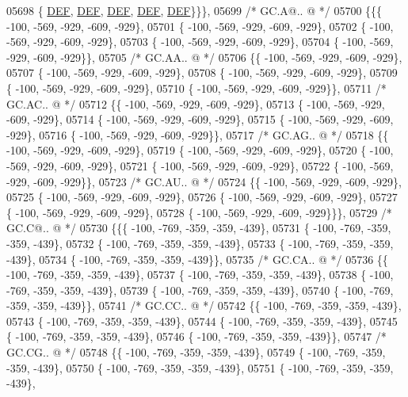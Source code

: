 \begin{DoxyCode}
05698 \{  \mbox{\hyperlink{1_88_84__epars_8h_a397419fc12b37ed479c8abb9d444d843}{DEF}},  \mbox{\hyperlink{1_88_84__epars_8h_a397419fc12b37ed479c8abb9d444d843}{DEF}},  \mbox{\hyperlink{1_88_84__epars_8h_a397419fc12b37ed479c8abb9d444d843}{DEF}},  \mbox{\hyperlink{1_88_84__epars_8h_a397419fc12b37ed479c8abb9d444d843}{DEF}},  \mbox{\hyperlink{1_88_84__epars_8h_a397419fc12b37ed479c8abb9d444d843}{DEF}}\}\}\},
05699 \textcolor{comment}{/* GC.A@.. @ */}
05700 \{\{\{ -100, -569, -929, -609, -929\},
05701 \{ -100, -569, -929, -609, -929\},
05702 \{ -100, -569, -929, -609, -929\},
05703 \{ -100, -569, -929, -609, -929\},
05704 \{ -100, -569, -929, -609, -929\}\},
05705 \textcolor{comment}{/* GC.AA.. @ */}
05706 \{\{ -100, -569, -929, -609, -929\},
05707 \{ -100, -569, -929, -609, -929\},
05708 \{ -100, -569, -929, -609, -929\},
05709 \{ -100, -569, -929, -609, -929\},
05710 \{ -100, -569, -929, -609, -929\}\},
05711 \textcolor{comment}{/* GC.AC.. @ */}
05712 \{\{ -100, -569, -929, -609, -929\},
05713 \{ -100, -569, -929, -609, -929\},
05714 \{ -100, -569, -929, -609, -929\},
05715 \{ -100, -569, -929, -609, -929\},
05716 \{ -100, -569, -929, -609, -929\}\},
05717 \textcolor{comment}{/* GC.AG.. @ */}
05718 \{\{ -100, -569, -929, -609, -929\},
05719 \{ -100, -569, -929, -609, -929\},
05720 \{ -100, -569, -929, -609, -929\},
05721 \{ -100, -569, -929, -609, -929\},
05722 \{ -100, -569, -929, -609, -929\}\},
05723 \textcolor{comment}{/* GC.AU.. @ */}
05724 \{\{ -100, -569, -929, -609, -929\},
05725 \{ -100, -569, -929, -609, -929\},
05726 \{ -100, -569, -929, -609, -929\},
05727 \{ -100, -569, -929, -609, -929\},
05728 \{ -100, -569, -929, -609, -929\}\}\},
05729 \textcolor{comment}{/* GC.C@.. @ */}
05730 \{\{\{ -100, -769, -359, -359, -439\},
05731 \{ -100, -769, -359, -359, -439\},
05732 \{ -100, -769, -359, -359, -439\},
05733 \{ -100, -769, -359, -359, -439\},
05734 \{ -100, -769, -359, -359, -439\}\},
05735 \textcolor{comment}{/* GC.CA.. @ */}
05736 \{\{ -100, -769, -359, -359, -439\},
05737 \{ -100, -769, -359, -359, -439\},
05738 \{ -100, -769, -359, -359, -439\},
05739 \{ -100, -769, -359, -359, -439\},
05740 \{ -100, -769, -359, -359, -439\}\},
05741 \textcolor{comment}{/* GC.CC.. @ */}
05742 \{\{ -100, -769, -359, -359, -439\},
05743 \{ -100, -769, -359, -359, -439\},
05744 \{ -100, -769, -359, -359, -439\},
05745 \{ -100, -769, -359, -359, -439\},
05746 \{ -100, -769, -359, -359, -439\}\},
05747 \textcolor{comment}{/* GC.CG.. @ */}
05748 \{\{ -100, -769, -359, -359, -439\},
05749 \{ -100, -769, -359, -359, -439\},
05750 \{ -100, -769, -359, -359, -439\},
05751 \{ -100, -769, -359, -359, -439\},

\end{DoxyCode}
